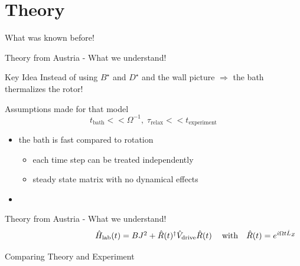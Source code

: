 \section{Theory}
\begin{frame}{What was known before!}
    
\end{frame}
\begin{frame}{Theory from Austria - What we understand!}
    \begin{bigidea}{Key Idea}
        Instead of using $B^\star$ and $D^\star$ and the wall picture $\Rightarrow$ the bath thermalizes the rotor!
    \end{bigidea}
    \begin{block}{Assumptions made for that model}
        \centering
        \begin{equation*}
            t_{\mathrm{bath}} << \Omega^{-1},\; \tau_{\mathrm{relax}} << t_{\mathrm{experiment}}
        \end{equation*}
        \begin{itemize}
            \item the bath is fast compared to rotation
            \begin{itemize}
                \item each time step can be treated independently
                \item steady state matrix with no dynamical effects
            \end{itemize}
            \item 
        \end{itemize}
    \end{block}
\end{frame}
\begin{frame}{Theory from Austria - What we understand!}
    \begin{equation*}
\makebox[\textwidth][c]{%
  $\hat{H}_{\mathrm{lab}}(t) =
  BJ^2 + \hat{R}(t)^\dagger
  \hat{V}_{\mathrm{drive}}\hat{R}(t)$%
}
\makebox[0pt][r]{%
  $\text{with}\quad
  \hat{R}(t) = e^{i\Omega t \hat{L}_{Z}}$%
}
\end{equation*}

\end{frame}
\begin{frame}{Comparing Theory and Experiment}
    
\end{frame}